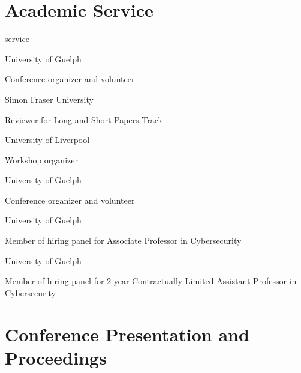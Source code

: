\section{Academic Service}
\begin{revlist}{service}
\item {}
  University of Guelph
  \begin{cvbullets}\item Conference organizer and volunteer\end{cvbullets}
\item {}
  Simon Fraser University
  \begin{cvbullets}\item Reviewer for Long and Short Papers Track\end{cvbullets}
\item {}
  University of Liverpool
  \begin{cvbullets}\item Workshop organizer\end{cvbullets}
\item {}
  University of Guelph
  \begin{cvbullets}\item Conference organizer and volunteer\end{cvbullets}
\item {}
  University of Guelph
  \begin{cvbullets}\item Member of hiring panel for Associate Professor in Cybersecurity\end{cvbullets}
\item {}
  University of Guelph
  \begin{cvbullets}\item Member of hiring panel for 2-year Contractually Limited Assistant Professor in Cybersecurity\end{cvbullets}
\end{revlist}

\section{Conference Presentation and Proceedings}
\legenddirect

